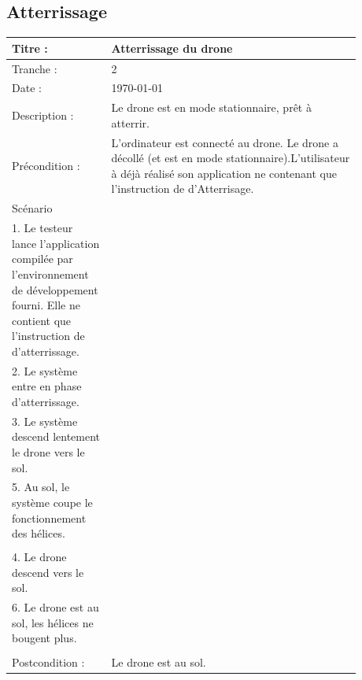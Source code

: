 \documentclass[12pt, openany]{report}
\begin{document}
\subsection*{Atterrissage}
\begin{tabular}{|p{0.25\linewidth} | p{0.21\linewidth} | p{0.21\linewidth} | p{0.21\linewidth} |} 
\hline
\rowcolor[RGB]{200, 200, 200}Titre :& \multicolumn{3}{p{0.70\linewidth}|}{Atterrissage du drone} \\
\hline
Tranche :& \multicolumn{3}{p{0.70\linewidth}|}{2} \\
\hline
Date :& \multicolumn{3}{p{0.70\linewidth}|}{\today }\\
\hline
Description :& \multicolumn{3}{p{0.70\linewidth}|}{Le drone est en mode stationnaire, prêt à atterrir.} \\
\hline
Précondition :& \multicolumn{3}{p{0.70\linewidth}|}{L'ordinateur est connecté au drone. Le drone a décollé (et est en mode stationnaire).L'utilisateur à déjà réalisé son application ne contenant que l'instruction de d'Atterrisage.} \\
\hline
Scénario & {
	\begin{minipage}[t]{\linewidth}
	Utilisateur : \\
	1. Le testeur lance l'application compilée par l'environnement de développement fourni. Elle ne contient que l'instruction de d'atterrissage.
	 \end{minipage}
	} & {
	\begin{minipage}[t]{\linewidth}
	Application :\\
	2. Le système entre en phase d'atterrissage.\\
	3. Le système descend lentement le drone vers le sol.\\
	5. Au sol, le système coupe le fonctionnement des hélices. \\
	 \end{minipage}
	} & {
	\begin{minipage}[t]{\linewidth}
	Drone :\\
	4. Le drone descend vers le sol.\\
	6. Le drone est au sol, les hélices ne bougent plus.\\
	 \end{minipage}
	} \\

\hline
Postcondition : & \multicolumn{3}{p{0.70\linewidth}|}{Le drone est au sol.}\\
\hline
\end{tabular}
\end{document}
